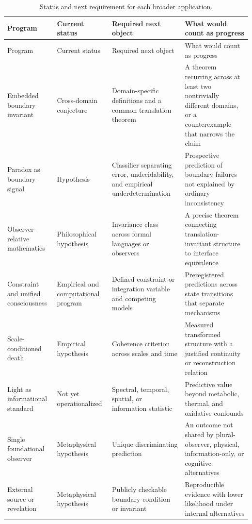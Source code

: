 \begingroup
\small
\begin{longtable}{@{}>{\raggedright\arraybackslash}p{}>{\raggedright\arraybackslash}p{}>{\raggedright\arraybackslash}p{}>{\raggedright\arraybackslash}p{}@{}}
\caption{Status and next requirement for each broader application.}\label{tab:hypothesisregister}\\
\toprule
Program & Current status & Required next object & What would count as progress \\
\midrule
\endfirsthead
\toprule
Program & Current status & Required next object & What would count as progress \\
\midrule
\endhead
Embedded boundary invariant & Cross-domain conjecture & Domain-specific definitions and a common translation theorem & A theorem recurring across at least two nontrivially different domains, or a counterexample that narrows the claim \\
Paradox as boundary signal & Hypothesis & Classifier separating error, undecidability, and empirical underdetermination & Prospective prediction of boundary failures not explained by ordinary inconsistency \\
Observer-relative mathematics & Philosophical hypothesis & Invariance class across formal languages or observers & A precise theorem connecting translation-invariant structure to interface equivalence \\
Constraint and unified consciousness & Empirical and computational program & Defined constraint or integration variable and competing models & Preregistered predictions across state transitions that separate mechanisms \\
Scale-conditioned death & Empirical hypothesis & Coherence criterion across scales and time & Measured transformed structure with a justified continuity or reconstruction relation \\
Light as informational standard & Not yet operationalized & Spectral, temporal, spatial, or information statistic & Predictive value beyond metabolic, thermal, and oxidative confounds \\
Single foundational observer & Metaphysical hypothesis & Unique discriminating prediction & An outcome not shared by plural-observer, physical, information-only, or cognitive alternatives \\
External source or revelation & Metaphysical hypothesis & Publicly checkable boundary condition or invariant & Reproducible evidence with lower likelihood under internal alternatives \\

\end{longtable}
